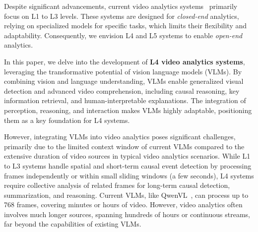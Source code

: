 Despite significant advancements, current video analytics systems~\cite{khani2023recl, bhardwaj2022ekya, zhang2024vulcan, padmanabhan2023gemel, lu2022turbo, sivaraman2024gemino, zhang2021sensei, remix_mobicom_21} primarily focus on L1 to L3 levels. These systems are designed for \emph{closed-end} analytics, relying on specialized models for specific tasks, which limits their flexibility and adaptability. Consequently, we envision L4 and L5 systems to enable \emph{open-end} analytics.







In this paper, we delve into the development of \textbf{L4 video analytics systems}, leveraging the transformative potential of vision language models (VLMs). By combining vision and language understanding, VLMs enable generalized visual detection and advanced video comprehension, including causal reasoning, key information retrieval, and human-interpretable explanations. The integration of perception, reasoning, and interaction makes VLMs highly adaptable, positioning them as a key foundation for L4 systems.


However, integrating VLMs into video analytics poses significant challenges, primarily due to the limited context window of current VLMs compared to the extensive duration of video sources in typical video analytics scenarios. While L1 to L3 systems handle spatial and short-term causal event detection by processing frames independently or within small sliding windows (\eg a few seconds), L4 systems require collective analysis of related frames for long-term causal detection, summarization, and reasoning. Current VLMs, like QwenVL~\cite{wang2024qwen2}, can process up to 768 frames, covering minutes or hours of video. However, video analytics often involves much longer sources, spanning  hundreds of hours or continuous streams, far beyond the capabilities of existing VLMs.


